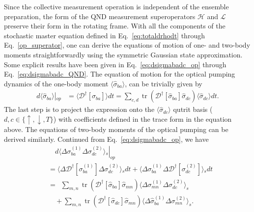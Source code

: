 \documentclass[aps,pra,twocolumn,superscriptaddress]{revtex4-1} %
\DeclareMathOperator{\tr}{tr}
\newcommand{\nn}{\nonumber}
\newcommand{\expect}[1]{\big\langle #1 \big\rangle}
\begin{document}
\begin{appendix}
Since the collective measurement operation is independent of the ensemble preparation, the form of the QND measurement superoperators $ \mathcal{H} $ and $ \mathcal{L} $ preserve their form in the rotating frame. With all the components of the stochastic master equation defined in Eq.~\eqref{eq:totaldrhodt} through Eq.~\eqref{op_superator}, one can derive the equations of motion of one- and two-body moments straightforwardly using the symmetric Gaussian state approximation. Some explicit results have been given in Eq.~\eqref{eq:dsigmabadc_op} through Eq.~\eqref{eq:dsigmabadc_QND}. The equation of motion for the optical pumping dynamics of the one-body moment $ \expect{\hat{\sigma}_{ba}} $, can be trivially given by
\begin{align}
\left.d\expect{\!\hat{\sigma}_{ba}\!}\right|\!_{op}\!&=\! \expect{\!\mathcal{D}^\dagger\!\left[\hat{\sigma}_{ba} \right]\!}dt\!=\!\!\!\sum_{c,d}\!\!\tr(\mathcal{D}^\dagger\!\left[\hat{\sigma}_{ba}\right]\!\hat{\sigma}_{dc} )\expect{\!\hat{\sigma}_{dc}\!}dt.\label{eq:dsigmaba_op_expand}
\end{align}
The last step is to project the expression onto the $ \expect{\hat{\sigma}_{dc}} $ qutrit basis ($ d,c\in \{\uparrow,\downarrow,T\} $) with coefficients defined in the trace form in the equation above. The equations of two-body moments of the optical pumping can be derived similarly. Continued from Eq.~\eqref{eq:dsigmabadc_op}, we have
\begin{align}
&\quad\left.d\expect{\!\Delta \sigma_{ba}^{(\!1\!)}\Delta\sigma_{dc}^{(\!2\!)} }\!_s\right|_{op}\nn\\
&= \expect{\!\Delta\mathcal{D}^\dagger[ \sigma_{ba}^{(\!1\!)}]\Delta\sigma_{dc}^{(\!2\!)} }\!_sdt \!+\! \expect{\!\Delta \sigma_{ba}^{(\!1\!)} \Delta\mathcal{D}^\dagger[\sigma_{dc}^{(\!2\!)}] }\!_sdt\nn \\
&=\,\,\,\sum_{m,n}\! \tr\!\left(\! \mathcal{D}^\dagger[\hat{\sigma}_{ba} ]\hat{\sigma}_{mn}\! \right)\!\expect{\!\Delta\sigma_{mn}^{(\!1\!)}\Delta\sigma_{dc}^{(\!2\!)} }_s \nn\\
&\quad +\!\! \sum_{m,n}\!\tr\!\left(\mathcal{D}^\dagger[\hat{\sigma}_{dc}]\hat{\sigma}_{mn} \right)\!\expect{\!\Delta\hat{\sigma}_{ba}^{(\!1\!)}\Delta\sigma_{mn}^{(\!2\!)} }_s .\label{eq:dsigmabadc_op_expand}
\end{align}

\end{appendix}
\end{document}
